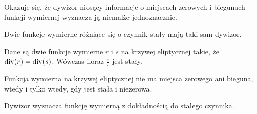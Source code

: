 Okazuje się, że dywizor niosący informacje o miejscach zerowych i biegunach
funkcji wymiernej wyznacza ją niemalże jednoznacznie.

\begin{fact}
Dwie funkcje wymierne różniące się o czynnik stały mają taki sam dywizor.
\end{fact}

\begin{theorem}
Dane są dwie funkcje wymierne $r$ i $s$ na krzywej eliptycznej takie,
że $\operatorname{div}(r) = \operatorname{div}(s)$.
Wówczas iloraz $\frac{r}{s}$ jest stały.
\end{theorem}

\begin{corollary}\label{zero_div_const_fun_coro}
Funkcja wymierna na krzywej eliptycznej nie ma miejsca zerowego ani bieguna,
wtedy i tylko wtedy, gdy jest stała i niezerowa.
\end{corollary}

\begin{corollary}\label{fun_divi_equiv_to_const_lemma}
Dywizor wyznacza funkcję wymierną z dokładnością do stałego czynnika.
\end{corollary}
